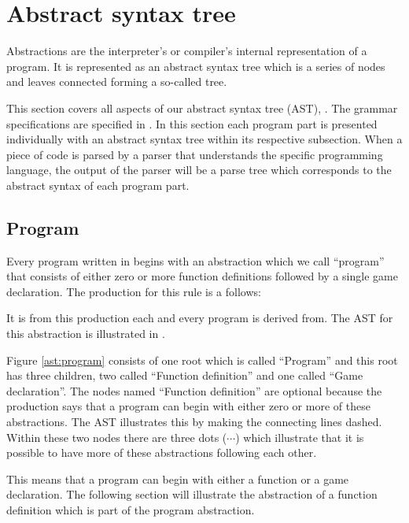 \section{Abstract syntax tree}
\label{sec:ast}

Abstractions are the interpreter's or compiler's internal representation of a program. It is represented as an abstract syntax tree which is a series of nodes and leaves connected forming a so-called tree.

This section covers all aspects of our abstract syntax tree (AST), . The grammar specifications are specified in . In this section each program part is presented individually with an abstract syntax tree within its respective subsection.
When a piece of code is parsed by a parser that understands the specific programming language, the output of the parser will be a parse tree which corresponds to the abstract syntax of each program part.

\subsection{Program}
Every program written in \productname{} begins with an abstraction which we call ``program'' that consists of either zero or more function definitions followed by a single game declaration. The production for this rule is a follows:

\begin{ebnf}
\end{ebnf}

It is from this production each and every program is derived from. The AST for this abstraction is illustrated in .



Figure \ref{ast:program} consists of one root which is called ``Program'' and this root has three children, two called ``Function definition'' and one called ``Game declaration''. The nodes named ``Function definition'' are optional because the production says that a program can begin with either zero or more of these abstractions. The AST illustrates this by making the connecting lines dashed. Within these two nodes there are three dots ($\cdots$) which illustrate that it is possible to have more of these abstractions following each other.

This means that a program can begin with either a function or a game declaration. The following section will illustrate the abstraction of a function definition which is part of the program abstraction.

